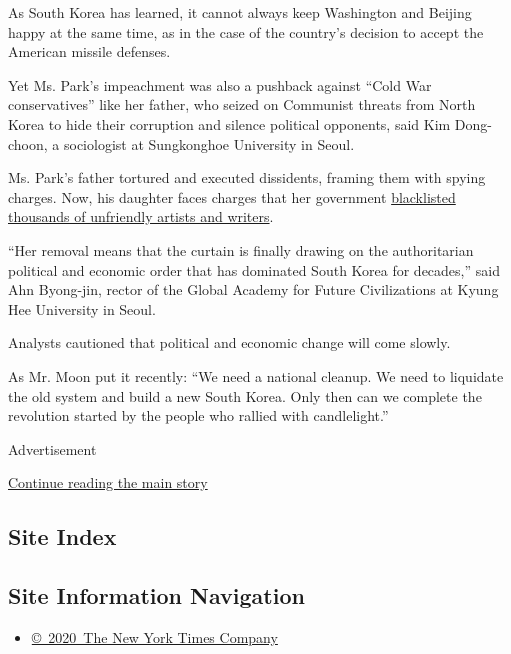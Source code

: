 As South Korea has learned, it cannot always keep Washington and Beijing
happy at the same time, as in the case of the country's decision to
accept the American missile defenses.

Yet Ms. Park's impeachment was also a pushback against ``Cold War
conservatives'' like her father, who seized on Communist threats from
North Korea to hide their corruption and silence political opponents,
said Kim Dong-choon, a sociologist at Sungkonghoe University in Seoul.

Ms. Park's father tortured and executed dissidents, framing them with
spying charges. Now, his daughter faces charges that her government
\href{https://www.nytimes.com/2017/01/12/world/asia/south\%2Dkorea\%2Dpresident\%2Dpark\%2Dblacklist\%2Dartists.html}{blacklisted
thousands of unfriendly artists and writers}.

``Her removal means that the curtain is finally drawing on the
authoritarian political and economic order that has dominated South
Korea for decades,'' said Ahn Byong-jin, rector of the Global Academy
for Future Civilizations at Kyung Hee University in Seoul.

Analysts cautioned that political and economic change will come slowly.

As Mr. Moon put it recently: ``We need a national cleanup. We need to
liquidate the old system and build a new South Korea. Only then can we
complete the revolution started by the people who rallied with
candlelight.''

Advertisement

\protect\hyperlink{after-bottom}{Continue reading the main story}

\hypertarget{site-index}{%
\subsection{Site Index}\label{site-index}}

\hypertarget{site-information-navigation}{%
\subsection{Site Information
Navigation}\label{site-information-navigation}}

\begin{itemize}
\tightlist
\item
  \href{https://help.nytimes.com/hc/en-us/articles/115014792127-Copyright-notice}{©~2020~The
  New York Times Company}
\end{itemize}

